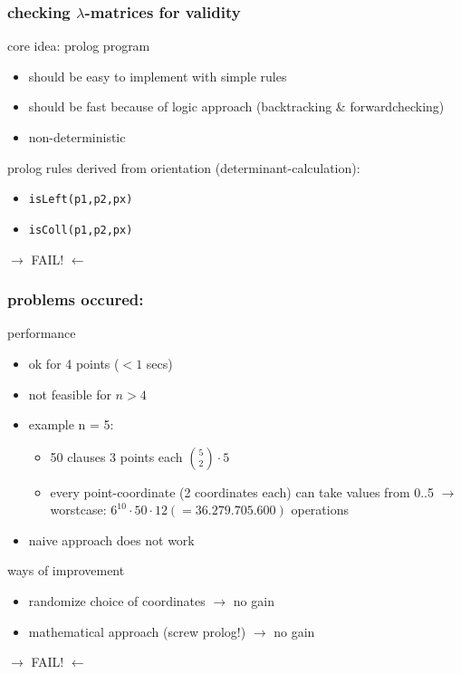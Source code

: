 \documentclass{beamer}
\begin{document}
\begin{frame}
\frametitle{checking $\lambda$-matrices for validity}
core idea: prolog program
\begin{itemize}
	\item should be easy to implement with simple rules
	\item should be fast because of logic approach (backtracking \& forwardchecking)
	\item non-deterministic
\end{itemize}
prolog rules derived from orientation (determinant-calculation):
\begin{itemize}
 \item \texttt{isLeft(p1,p2,px)}
 \item \texttt{isColl(p1,p2,px)}
\end{itemize}
\pause
\begin{center}
\huge{ $\rightarrow$ FAIL! $\leftarrow$}
\end{center}

\end{frame}



\begin{frame}
\frametitle{problems occured:}
performance
\begin{itemize}
\item ok for 4 points ($<1$ secs)
\item not feasible for $n > 4$
\item example n = 5:
\begin{itemize}
  \item 50 clauses 3 points each $\binom{5}{2} \cdot 5$
  \item every point-coordinate (2 coordinates each) can take values from 0..5 \newline $\rightarrow$ worstcase: $6^{10} \cdot 50 \cdot 12 (=36.279.705.600)$ operations
\end{itemize}
\item naive approach does not work
\end{itemize}
ways of improvement
\begin{itemize}
\item randomize choice of coordinates $\rightarrow$ no gain
\item mathematical approach (screw prolog!) $\rightarrow$ no gain
\end{itemize}
\pause
\begin{center}
\huge{ $\rightarrow$ FAIL! $\leftarrow$}
\end{center}
\end{frame}
\end{document}
